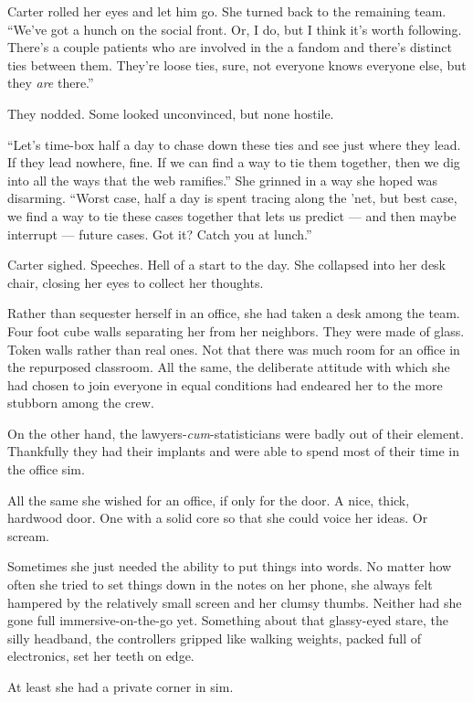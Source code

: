 Carter rolled her eyes and let him go. She turned back to the remaining team. ``We've got a hunch on the social front. Or, I do, but I think it's worth following. There's a couple patients who are involved in the a fandom and there's distinct ties between them. They're loose ties, sure, not everyone knows everyone else, but they \emph{are} there.''

They nodded. Some looked unconvinced, but none hostile.

``Let's time-box half a day to chase down these ties and see just where they lead. If they lead nowhere, fine. If we can find a way to tie them together, then we dig into all the ways that the web ramifies.'' She grinned in a way she hoped was disarming. ``Worst case, half a day is spent tracing along the 'net, but best case, we find a way to tie these cases together that lets us predict --- and then maybe interrupt --- future cases. Got it? Catch you at lunch.''

Carter sighed. Speeches. Hell of a start to the day. She collapsed into her desk chair, closing her eyes to collect her thoughts.

Rather than sequester herself in an office, she had taken a desk among the team. Four foot cube walls separating her from her neighbors. They were made of glass. Token walls rather than real ones. Not that there was much room for an office in the repurposed classroom. All the same, the deliberate attitude with which she had chosen to join everyone in equal conditions had endeared her to the more stubborn among the crew.

On the other hand, the lawyers-\emph{cum}-statisticians were badly out of their element. Thankfully they had their implants and were able to spend most of their time in the office sim.

All the same she wished for an office, if only for the door. A nice, thick, hardwood door. One with a solid core so that she could voice her ideas. Or scream.

Sometimes she just needed the ability to put things into words. No matter how often she tried to set things down in the notes on her phone, she always felt hampered by the relatively small screen and her clumsy thumbs. Neither had she gone full immersive-on-the-go yet. Something about that glassy-eyed stare, the silly headband, the controllers gripped like walking weights, packed full of electronics, set her teeth on edge.

At least she had a private corner in sim.

